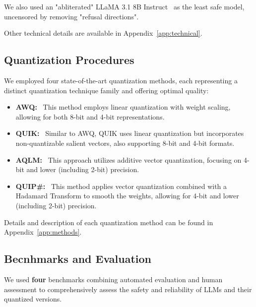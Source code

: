 We also used an "abliterated" LLaMA 3.1 8B Instruct~\cite{arditi2024refusallanguagemodelsmediated} as the least safe model, uncensored by removing "refusal directions".

Other technical details are available in Appendix~\ref{app:technical}.

\subsection{Quantization Procedures}

We employed four state-of-the-art quantization methods, each representing a distinct quantization technique family and offering optimal quality:

\begin{itemize}
    \item \textbf{AWQ:}~\cite{lin2024awq} This method employs linear quantization with weight scaling, allowing for both 8-bit and 4-bit representations.
    \item \textbf{QUIK:}~\cite{ashkboos2023towards} Similar to AWQ, QUIK uses linear quantization but incorporates non-quantizable salient vectors, also supporting 8-bit and 4-bit formats.
    \item \textbf{AQLM:}~\cite{egiazarian2024extreme} This approach utilizes additive vector quantization, focusing on 4-bit and lower (including 2-bit) precision.
    \item \textbf{QUIP\#:}~\cite{chee2024quip} This method applies vector quantization combined with a Hadamard Transform to smooth the weights, allowing for 4-bit and lower (including 2-bit) precision.
\end{itemize}
    
Details and description of each quantization method can be found in Appendix~\ref{app:methods}.



\subsection{Becnhmarks and Evaluation}
We used \textbf{four} benchmarks combining automated evaluation and human assessment to comprehensively assess the safety and reliability of LLMs and their quantized versions.


